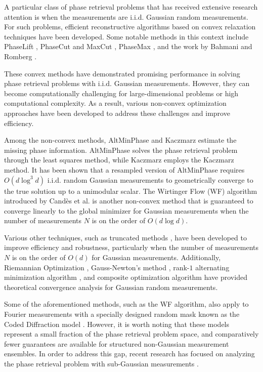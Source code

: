 \documentclass{article}
\newcommand{\0}{{\mathbf 0}}
\numberwithin{equation}{section}
\begin{document}
	A particular class of phase retrieval problems that has received extensive research attention is when the measurements are i.i.d. Gaussian random measurements. For such problems, efficient reconstructive algorithms based on convex relaxation techniques have been developed. Some notable methods in this context include PhaseLift \citep{candes2014solving,candes2015phase1}, PhaseCut and MaxCut \citep{ waldspurger2015phase}, PhaseMax \citep{goldstein2018phasemax}, and the work by Bahmani and Romberg \citeyearpar{bahmani2017phase}.
	
	
	These convex methods have demonstrated promising performance in solving phase retrieval problems with i.i.d. Gaussian measurements. However, they can become computationally challenging for large-dimensional problems or high computational complexity. As a result, various non-convex optimization approaches have been developed to address these challenges and improve efficiency.
	
	Among the non-convex methods, AltMinPhase \citep{netrapalli2015phase} and Kaczmarz \citep{wei2015solving} estimate the missing phase information. AltMinPhase solves the phase retrieval problem through the least squares method, while Kaczmarz employs the Kaczmarz method. It has been shown that a resampled version of AltMinPhase requires $O(d\log^3 d)$ i.i.d. random Gaussian measurements to geometrically converge to the true solution up to a unimodular scalar. The Wirtinger Flow (WF) algorithm introduced by Cand\`es et al. \citeyearpar{candes2015phase} is another non-convex method that is guaranteed to converge linearly to the global minimizer for Gaussian measurements when the number of measurements $N$ is on the order of $O(d\log d)$.
	
	Various other techniques, such as truncated methods \citep{chen2015solving, wang2017solving}, have been developed to improve efficiency and robustness, particularly when the number of measurements $N$ is on the order of $O(d)$ for Gaussian measurements. Additionally, Riemannian Optimization \citep{wei2016Guarantees,cai2024solving}, Gauss-Newton's method \citep{gao2017phaseless}, rank-$1$ alternating minimization algorithm \citep{cai2019fast}, and composite optimization algorithm \citep{duchi2019solving} have provided theoretical convergence analysis for Gaussian random measurements.
	
	Some of the aforementioned methods, such as the WF algorithm, also apply to Fourier measurements with a specially designed random mask known as the Coded Diffraction model \citep{candes2015phase}. However, it is worth noting that these models represent a small fraction of the phase retrieval problem space, and comparatively fewer guarantees are available for structured non-Gaussian measurement ensembles. In order to address this gap, recent research has focused on analyzing the phase retrieval problem with sub-Gaussian measurements \citep{gao2021phase,krahmer2020complex, li2021phase}. 
	
\end{document}
